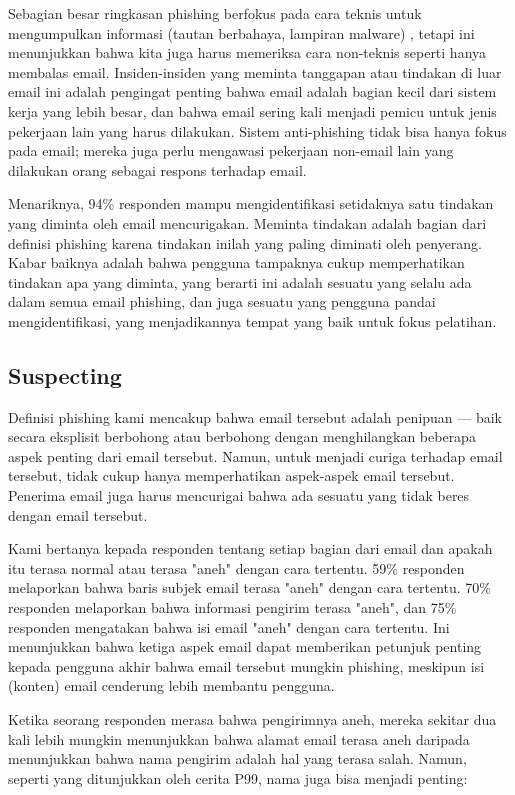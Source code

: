 \documentclass[lettersize,journal]{IEEEtran}
\begin{document}
Sebagian besar ringkasan phishing berfokus pada cara teknis untuk mengumpulkan
informasi (tautan berbahaya, lampiran malware) \cite{tigadua}, tetapi ini
menunjukkan bahwa kita juga harus memeriksa cara non-teknis seperti hanya
membalas email. Insiden-insiden yang meminta tanggapan atau tindakan di luar
email ini adalah pengingat penting bahwa email adalah bagian kecil dari sistem
kerja yang lebih besar, dan bahwa email sering kali menjadi pemicu untuk jenis
pekerjaan lain yang harus dilakukan. Sistem anti-phishing tidak bisa hanya
fokus pada email; mereka juga perlu mengawasi pekerjaan non-email lain yang
dilakukan orang sebagai respons terhadap email.

Menariknya, 94\% responden mampu mengidentifikasi setidaknya satu tindakan yang
diminta oleh email mencurigakan. Meminta tindakan adalah bagian dari definisi
phishing karena tindakan inilah yang paling diminati oleh penyerang. Kabar
baiknya adalah bahwa pengguna tampaknya cukup memperhatikan tindakan apa yang
diminta, yang berarti ini adalah sesuatu yang selalu ada dalam semua email
phishing, dan juga sesuatu yang pengguna pandai mengidentifikasi, yang
menjadikannya tempat yang baik untuk fokus pelatihan.

\subsection{Suspecting}
Definisi phishing kami mencakup bahwa email tersebut adalah penipuan — baik
secara eksplisit berbohong atau berbohong dengan menghilangkan beberapa aspek
penting dari email tersebut. Namun, untuk menjadi curiga terhadap email
tersebut, tidak cukup hanya memperhatikan aspek-aspek email tersebut. Penerima
email juga harus mencurigai bahwa ada sesuatu yang tidak beres dengan email
tersebut.

Kami bertanya kepada responden tentang setiap bagian dari email dan apakah itu
terasa normal atau terasa "aneh" dengan cara tertentu. 59\% responden
melaporkan bahwa baris subjek email terasa "aneh" dengan cara tertentu. 70\%
responden melaporkan bahwa informasi pengirim terasa "aneh", dan 75\% responden
mengatakan bahwa isi email "aneh" dengan cara tertentu. Ini menunjukkan bahwa
ketiga aspek email dapat memberikan petunjuk penting kepada pengguna akhir
bahwa email tersebut mungkin phishing, meskipun isi (konten) email cenderung
lebih membantu pengguna.

Ketika seorang responden merasa bahwa pengirimnya aneh, mereka sekitar dua kali
lebih mungkin menunjukkan bahwa alamat email terasa aneh daripada menunjukkan
bahwa nama pengirim adalah hal yang terasa salah. Namun, seperti yang
ditunjukkan oleh cerita P99, nama juga bisa menjadi penting:
\end{document}
